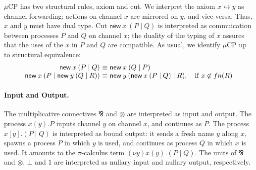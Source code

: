 \documentclass[orivec,envcountsame]{llncs}
\makeatletter
\newcommand{\parr}{\mathbin\bindnasrepma}
\newcommand{\cpdual}[1]{#1^\perp}
\newcommand{\mkwd}[1]{\mathsf{#1}}
\newcommand{\link}[2]{#1 \leftrightarrow #2}
\newcommand{\cut}[4]{\mkwd{new}\:#1 \: (#3 \mid #4)}
\newcommand{\mucp}{$\mu\mathrm{CP}$\xspace}
\newcommand{\ba}{\begin{array}}
\newcommand{\ea}{\end{array}}
\newenvironment{equations}{\[\ba{@{}r@{~}c@{~}l@{}}}{\ea\]}
\makeatother
\begin{document}
\mucp has two structural rules, axiom and cut.  We interpret the axiom $\link{x}{y}$ as channel
forwarding: actions on channel $x$ are mirrored on $y$, and vice versa.  Thus, $x$ and $y$ must have
dual type.  Cut $\cut{x}{A}{P}{Q}$ is interpreted as commuication between processes $P$ and $Q$ on
channel $x$; the duality of the typing of $x$ assures that the uses of the $x$ in $P$ and $Q$ are
compatible. As usual, we identify \mucp up to structural equivalence:
\begin{equations}
\small
  \cut{x}{A}{P}{Q} &\equiv& \cut{x}{\cpdual{A}}{Q}{P} \\
  \cut{x}{A}{P}{\cut{y}{B}{Q}{R}} &\equiv& \cut{y}{B}{\cut{x}{A}{P}{Q}}{R}, \quad \text{if $x \not\in fn(R)$} \\
\end{equations}%


\paragraph{Input and Output.}

The multiplicative connectives $\parr$ and $\otimes$ are interpreted as input and output. The
process $x(y).P$ inputs channel $y$ on channel $x$, and continues as $P$. The process $x[y].(P \mid
Q)$ is interpreted as bound output: it sends a fresh name $y$ along $x$, spawns a process $P$ in
which $y$ is used, and continues as process $Q$ in which $x$ is used.  It amounts to the
$\pi$-calculus term $(\nu y) \overline{x}(y).(P \mid Q)$. The units of $\parr$ and $\otimes$, $\bot$
and $1$ are interpreted as nullary input and nullary output, respectively.
\end{document}
